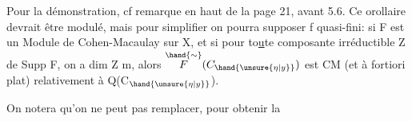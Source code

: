 Pour la démonstration, cf remarque en haut de la page 21, avant 5.6.
Ce orollaire devrait être modulé, mais pour simplifier on pourra
supposer f quasi-fini: si F est un Module de Cohen-Macaulay sur X, et si
pour to\uline{u}te composante irréductible Z de Supp F, on a dim Z \hand{$\geqslant$} m, alors
$\overset{\hand{\sim}}{F}(C_{\hand{\unsure{\eta|y}}})$ est CM (et à fortiori plat) relativement à Q(C$_{\hand{\unsure{\eta|y}}}$).

On notera qu'on ne peut pas remplacer, pour obtenir la

